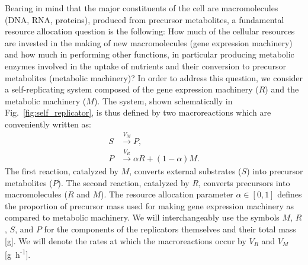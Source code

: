 Bearing in mind that the major constituents of the cell are macromolecules (DNA, RNA, proteins), produced from precursor metabolites, a fundamental resource allocation question is the following: How much of the cellular resources are invested in the making of new macromolecules (gene expression machinery) and how much in performing other functions, in particular producing metabolic enzymes involved in the uptake of nutrients and their conversion to precursor metabolites (metabolic machinery)?
In order to address this question, we consider a self-replicating system composed of the gene expression machinery ($R$) and the metabolic machinery ($M$).
The system, shown schematically in Fig.~\ref{fig:self_replicator}, is thus defined by two macroreactions which are conveniently written as:
\begin{equation}\label{eq:reactions}
\begin{aligned}
S &\overset{V_M}{\longrightarrow} P, \\
P &\overset{V_R}{\longrightarrow} \alpha R + (1-\alpha) M.
\end{aligned}
\end{equation}
The first reaction, catalyzed by $M$, converts external substrates ($S$) into precursor metabolites ($P$).
The second reaction, catalyzed by $R$, converts precursors into macromolecules ($R$ and $M$).
The resource allocation parameter $\alpha \in [0,1]$ defines the proportion of precursor mass used for making gene expression machinery as compared to metabolic machinery.
We will interchangeably use the symbols $M$, $R$, $S$, and $P$ for the components of the replicators themselves and their total mass [g].
We will denote the rates at which the macroreactions occur by $V_R$ and $V_M$ [g~h\textsuperscript{-1}].

